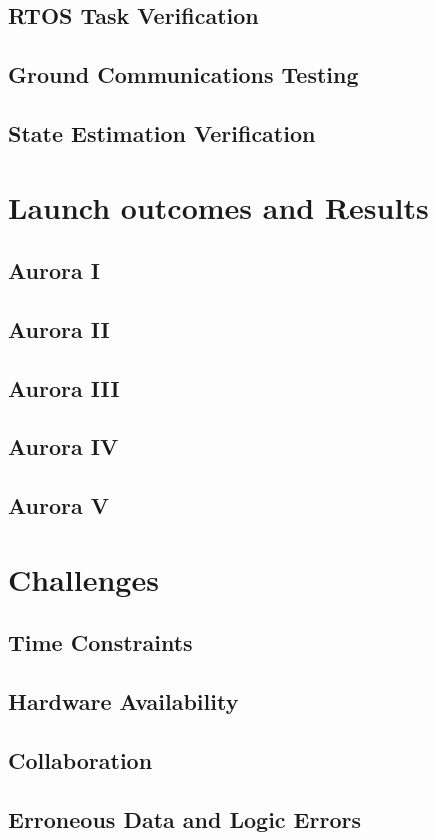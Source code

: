 \subsection{RTOS Task Verification}
\subsection{Ground Communications Testing}
\subsection{State Estimation Verification}

\section{Launch outcomes and Results}
\subsection{Aurora I}
\subsection{Aurora II}
\subsection{Aurora III}
\subsection{Aurora IV}
\subsection{Aurora V}

\section{Challenges}
\subsection{Time Constraints}
\subsection{Hardware Availability}
\subsection{Collaboration}
\subsection{Erroneous Data and Logic Errors}

